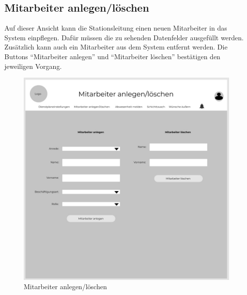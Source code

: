 \documentclass[11pt,
paper=a4,
bibtotocnumbered,	  %
liststotocnumbered,  %
DIV=calc,		  %
tablecaptionabove,	  %
headinclude,
]{article}
\begin{document}
\subsection{Mitarbeiter anlegen/löschen}
Auf dieser Ansicht kann die Stationsleitung einen neuen Mitarbeiter in das System einpflegen. Dafür müssen die zu sehenden Datenfelder ausgefüllt werden. Zusätzlich kann auch ein Mitarbeiter aus dem System entfernt werden. Die Buttons “Mitarbeiter anlegen” und “Mitarbeiter löschen” bestätigen den jeweiligen Vorgang.
\begin{figure}[H]
\includegraphics[scale=1]{Bilder/Mitarbeiter anlegen_loeschen.jpg}
\caption{Mitarbeiter anlegen/löschen}
\end{figure}
\end{document}
